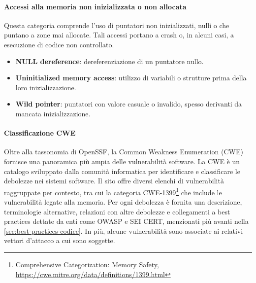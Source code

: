 \paragraph{Accessi alla memoria non inizializzata o non allocata}
\label{sec:invalid_access}

Questa categoria comprende l'uso di puntatori non inizializzati, nulli o che
puntano a zone mai allocate. Tali accessi portano a crash o, in alcuni casi, a esecuzione
di codice non controllato.

\begin{itemize}
  \item \textbf{NULL dereference}: dereferenziazione di un puntatore nullo.

  \item \textbf{Uninitialized memory access}: utilizzo di variabili o strutture prima
    della loro inizializzazione.

  \item \textbf{Wild pointer}: puntatori con valore casuale o invalido, spesso
    derivanti da mancata inizializzazione.
\end{itemize}

\paragraph{Classificazione CWE}
Oltre alla tassonomia di OpenSSF, la Common Weakness Enumeration (CWE) fornisce
una panoramica più ampia delle vulnerabilità software. La CWE è un catalogo sviluppato
dalla comunità informatica per identificare e classificare le debolezze nei sistemi
software. Il sito offre diversi elenchi di vulnerabilità raggruppate per
contesto, tra cui la categoria CWE-1399\footnote{Comprehensive Categorization: Memory
Safety, \url{https://cwe.mitre.org/data/definitions/1399.html}} che include le
vulnerabilità legate alla memoria. Per ogni debolezza è fornita una descrizione,
terminologie alternative, relazioni con altre debolezze e collegamenti a best practices
dettate da enti come OWASP e SEI CERT, menzionati più avanti nella
\autoref{sec:best-practices-codice}. In più, alcune vulnerabilità sono associate
ai relativi vettori d'attacco a cui sono soggette.